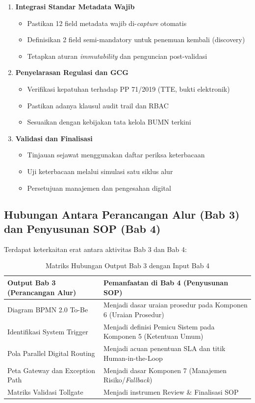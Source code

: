 \documentclass[12pt,a4paper]{report}
\begin{document}
\begin{enumerate}[leftmargin=*]
\item \textbf{Integrasi Standar Metadata Wajib}
\begin{itemize}
\item Pastikan 12 field metadata wajib di-\textit{capture} otomatis
\item Definisikan 2 field semi-mandatory untuk penemuan kembali (discovery)
\item Tetapkan aturan \textit{immutability} dan penguncian post-validasi
\end{itemize}

\item \textbf{Penyelarasan Regulasi dan GCG}
\begin{itemize}
\item Verifikasi kepatuhan terhadap PP 71/2019 (TTE, bukti elektronik)
\item Pastikan adanya klausul audit trail dan RBAC
\item Sesuaikan dengan kebijakan tata kelola BUMN terkini
\end{itemize}

\item \textbf{Validasi dan Finalisasi}
\begin{itemize}
\item Tinjauan sejawat menggunakan daftar periksa keterbacaan
\item Uji keterbacaan melalui simulasi satu siklus alur
\item Persetujuan manajemen dan pengesahan digital
\end{itemize}
\end{enumerate}

\subsection{Hubungan Antara Perancangan Alur (Bab 3) dan Penyusunan SOP (Bab 4)}

Terdapat keterkaitan erat antara aktivitas Bab 3 dan Bab 4:

\begin{table}[htbp]
\centering
\small
\caption{Matriks Hubungan Output Bab 3 dengan Input Bab 4}
\begin{tabularx}{\textwidth}{@{} >{\raggedright\arraybackslash}X >{\raggedright\arraybackslash}X @{}}
\toprule
\textbf{Output Bab 3 (Perancangan Alur)} & \textbf{Pemanfaatan di Bab 4 (Penyusunan SOP)} \\
\midrule
Diagram BPMN 2.0 To-Be & Menjadi dasar uraian prosedur pada Komponen 6 (Uraian Prosedur) \\
Identifikasi System Trigger & Menjadi definisi Pemicu Sistem pada Komponen 5 (Ketentuan Umum) \\
Pola Parallel Digital Routing & Menjadi acuan penentuan SLA dan titik Human-in-the-Loop \\
Peta Gateway dan Exception Path & Menjadi dasar Komponen 7 (Manajemen Risiko/\textit{Fallback}) \\
Matriks Validasi Tollgate & Menjadi instrumen Review \& Finalisasi SOP \\
\bottomrule
\end{tabularx}
\end{table}
\end{document}
